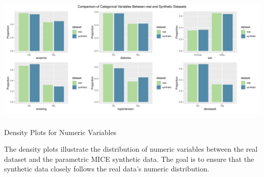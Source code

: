 \documentclass[
  letterpaper,
  DIV=11,
  numbers=noendperiod]{scrartcl}
\makeatletter
\let\oldsubparagraph\subparagraph
\renewcommand{\subparagraph}{
    \@ifstar
      \xxxSubParagraphStar
      \xxxSubParagraphNoStar
  }
\newcommand{\xxxSubParagraphStar}[1]{\oldsubparagraph*{#1}\mbox{}}
\newcommand{\xxxSubParagraphNoStar}[1]{\oldsubparagraph{#1}\mbox{}}
\makeatother
\begin{document}
\begin{center}
\includegraphics[width=1\linewidth,height=\textheight,keepaspectratio]{heart_failure_synthetic_data_project_files/figure-pdf/Bar Plots for Categorical Variables-1.pdf}
\end{center}

\subparagraph{Density Plots for Numeric
Variables}\label{density-plots-for-numeric-variables}

The density plots illustrate the distribution of numeric variables
between the real dataset and the parametric MICE synthetic data. The
goal is to ensure that the synthetic data closely follows the real
data's numeric distribution.
\end{document}
